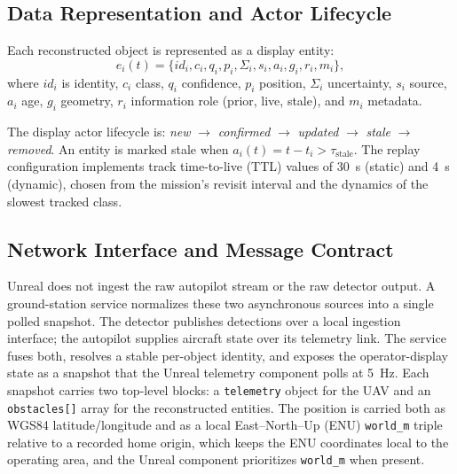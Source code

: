 \documentclass[fleqn]{VRIH2025}
\newcommand{\code}[1]{\texttt{#1}}
\begin{document}
\subsection{Data Representation and Actor Lifecycle}
Each reconstructed object is represented as a display entity:
\begin{equation}
e_i(t) = \{ id_i, c_i, q_i, p_i, \Sigma_i, s_i, a_i, g_i, r_i, m_i \},
\end{equation}
where \(id_i\) is identity, \(c_i\) class, \(q_i\) confidence, \(p_i\) position, \(\Sigma_i\) uncertainty, \(s_i\) source, \(a_i\) age, \(g_i\) geometry, \(r_i\) information role (prior, live, stale), and \(m_i\) metadata. 

The display actor lifecycle is: \textit{new} $\rightarrow$ \textit{confirmed} $\rightarrow$ \textit{updated} $\rightarrow$ \textit{stale} $\rightarrow$ \textit{removed}. An entity is marked stale when $a_i(t) = t - t_i > \tau_{\mathrm{stale}}$. The replay configuration implements track time-to-live (TTL) values of 30~s (static) and 4~s (dynamic), chosen from the mission's revisit interval and the dynamics of the slowest tracked class.

\subsection{Network Interface and Message Contract}
\label{sec:message-contract}
Unreal does not ingest the raw autopilot stream or the raw detector output. A ground-station service normalizes these two asynchronous sources into a single polled snapshot. The detector publishes detections over a local ingestion interface; the autopilot supplies aircraft state over its telemetry link. The service fuses both, resolves a stable per-object identity, and exposes the operator-display state as a snapshot that the Unreal telemetry component polls at 5~Hz. Each snapshot carries two top-level blocks: a \code{telemetry} object for the UAV and an \code{obstacles[]} array for the reconstructed entities. The position is carried both as WGS84 latitude/longitude and as a local East--North--Up (ENU) \code{world\_m} triple relative to a recorded home origin, which keeps the ENU coordinates local to the operating area, and the Unreal component prioritizes \code{world\_m} when present.
\end{document}

